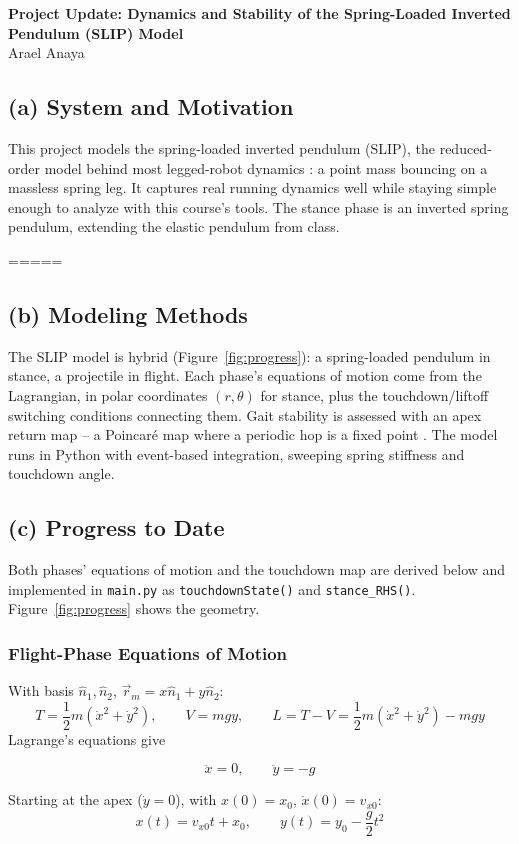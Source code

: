 \documentclass[10pt]{article}
\newcommand{\Name}{Arael Anaya}
\begin{document}
\begin{center}
    {\Large \textbf{Project Update: Dynamics and Stability of the Spring-Loaded Inverted Pendulum (SLIP) Model}}\\[2pt]
    \Name
\end{center}
\vspace{-4pt}

\subsection*{(a) System and Motivation}
This project models the spring-loaded inverted pendulum (SLIP), the
reduced-order model behind most legged-robot dynamics
\cite{full1999,saranli2001}: a point mass bouncing on a massless
spring leg. It captures real running dynamics well
\cite{blickhan1989,mcmahon1990} while staying simple enough to analyze
with this course's tools. The stance phase is an inverted spring
pendulum, extending the elastic pendulum from class.

=====
\subsection*{(b) Modeling Methods}
The SLIP model is hybrid (Figure~\ref{fig:progress}): a spring-loaded
pendulum in stance, a projectile in flight. Each phase's equations of
motion come from the Lagrangian, in polar coordinates $(r,\theta)$ for
stance, plus the touchdown/liftoff switching conditions connecting
them. Gait stability is assessed with an apex return map -- a
Poincar\'e map where a periodic hop is a fixed point
\cite{blickhan1989,schwind2000}. The model runs in Python with
event-based integration, sweeping spring stiffness and touchdown
angle.


\subsection*{(c) Progress to Date}
Both phases' equations of motion and the touchdown map are derived
below and implemented in \texttt{main.py} as
\texttt{touchdownState()} and \texttt{stance\_RHS()}.
Figure~\ref{fig:progress} shows the geometry.

\subsubsection*{Flight-Phase Equations of Motion}
With basis $\hat n_1,\hat n_2$, $\vec r_m=x\hat n_1+y\hat n_2$:
\[
    T=\frac12 m(\dot x^2+\dot y^2), \qquad V=mgy, \qquad
    L=T-V=\frac12m(\dot x^2+\dot y^2)-mgy
\]
Lagrange's equations give
\begin{result}
\[
    \ddot x = 0, \qquad \ddot y = -g
\]
\end{result}
Starting at the apex ($\dot y=0$), with $x(0)=x_0$, $\dot x(0)=v_{x0}$:
\[
    x(t)=v_{x0}t+x_0, \qquad y(t)=y_0-\frac{g}{2}t^2
\]
\end{document}
